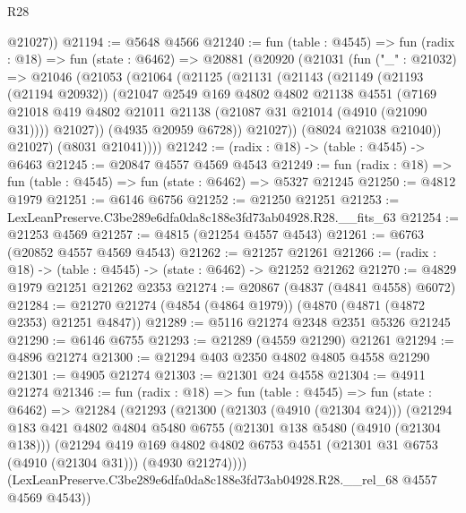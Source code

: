 \begin{lexlean}{R28}
\begin{coremodule}
        @21027))
@21194 := @5648 @4566
@21240 := fun (table : @4545) =>
  fun (radix : @18) =>
  fun (state : @6462) =>
  @20881
    (@20920
      (@21031
        (fun ("_" : @21032) =>
        @21046
          (@21053
            (@21064
              (@21125
                (@21131
                  (@21143
                    (@21149
                      (@21193 (@21194 @20932))
                      (@21047
                        @2549
                        @169
                        @4802
                        @4802
                        @21138
                        @4551
                        (@7169
                          @21018
                          @419
                          @4802
                          @21011
                          @21138
                          (@21087 @31 @21014 (@4910 (@21090 @31))))
                        @21027))
                    (@4935 @20959 @6728))
                  @21027))
              (@8024 @21038 @21040))
            @21027)
          (@8031 @21041))))
@21242 := (radix : @18) -> (table : @4545) -> @6463
@21245 := @20847 @4557 @4569 @4543
@21249 := fun (radix : @18) => fun (table : @4545) => fun (state : @6462) => @5327 @21245
@21250 := @4812 @1979
@21251 := @6146 @6756
@21252 := @21250 @21251
@21253 := LexLeanPreserve.C3be289e6dfa0da8c188e3fd73ab04928.R28.__fits_63
@21254 := @21253 @4569
@21257 := @4815 (@21254 @4557 @4543)
@21261 := @6763 (@20852 @4557 @4569 @4543)
@21262 := @21257 @21261
@21266 := (radix : @18) -> (table : @4545) -> (state : @6462) -> @21252 @21262
@21270 := @4829 @1979 @21251 @21262 @2353
@21274 := @20867 (@4837 (@4841 @4558) @6072)
@21284 := @21270 @21274 (@4854 (@4864 @1979)) (@4870 (@4871 (@4872 @2353) @21251 @4847))
@21289 := @5116 @21274 @2348 @2351 @5326 @21245
@21290 := @6146 @6755
@21293 := @21289 (@4559 @21290) @21261
@21294 := @4896 @21274
@21300 := @21294 @403 @2350 @4802 @4805 @4558 @21290
@21301 := @4905 @21274
@21303 := @21301 @24 @4558
@21304 := @4911 @21274
@21346 := fun (radix : @18) =>
  fun (table : @4545) =>
  fun (state : @6462) =>
  @21284
    (@21293
      (@21300
        (@21303 (@4910 (@21304 @24)))
        (@21294
          @183
          @421
          @4802
          @4804
          @5480
          @6755
          (@21301 @138 @5480 (@4910 (@21304 @138)))
          (@21294
            @419
            @169
            @4802
            @4802
            @6753
            @4551
            (@21301 @31 @6753 (@4910 (@21304 @31)))
            (@4930 @21274))))
      (LexLeanPreserve.C3be289e6dfa0da8c188e3fd73ab04928.R28.__rel_68 @4557 @4569 @4543))

\end{coremodule}
\end{lexlean}
